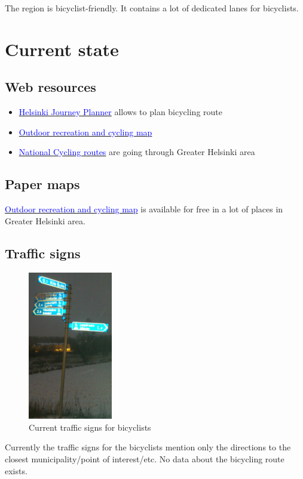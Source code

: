 \documentclass[a4paper]{article}
\newcommand{\myhref}[2]{{\href{#1}{\textcolor{blue}{#2}}}}
\begin{document}
The region is bicyclist-friendly. It contains a lot of dedicated lanes for bicyclists.

\section{Current state}
\subsection{Web resources}
\begin{itemize}
\item \myhref{http://pk.reittiopas.fi/en/}{Helsinki Journey Planner} allows to plan bicycling route
\item \myhref{http://www.ulkoilukartta.fi/}{Outdoor recreation and cycling map}
\item \myhref{http://www.pyoraillensuomessa.fi/en/node/2}{National Cycling routes} are going through Greater Helsinki area
\end{itemize}

\subsection{Paper maps}
\myhref{http://www.ulkoilukartta.fi/}{Outdoor recreation and cycling map} is available for free in a lot of places in Greater Helsinki area.

\subsection{Traffic signs}
\begin{figure}[!h]
\centerline{\includegraphics[keepaspectratio,height=6.5cm]{kilo}}
\caption{Current traffic signs for bicyclists}
\end{figure}

Currently the traffic signs for the bicyclists mention only the directions to the closest municipality/point of interest/etc. No data about the bicycling route exists.
\end{document}
